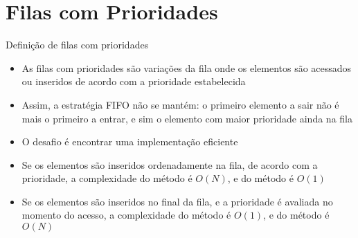 \section{Filas com Prioridades}

\begin{frame}[fragile]{Definição de filas com prioridades}

    \begin{itemize}
        \item As filas com prioridades são variações da fila onde os elementos são
            acessados ou inseridos de acordo com a prioridade estabelecida

        \item Assim, a estratégia FIFO não se mantém: o primeiro elemento a sair não é mais
            o primeiro a entrar, e sim o elemento com maior prioridade ainda na fila

        \item O desafio é encontrar uma implementação eficiente

        \item Se os elementos são inseridos ordenadamente na fila, de acordo com a prioridade,
            a complexidade do método  é $O(N)$, e do método  é 
            $O(1)$

        \item Se os elementos são inseridos no final da fila, e a prioridade é avaliada no
            momento do acesso, a complexidade do método  é $O(1)$, e do método 
             é $O(N)$
    \end{itemize}

\end{frame}

